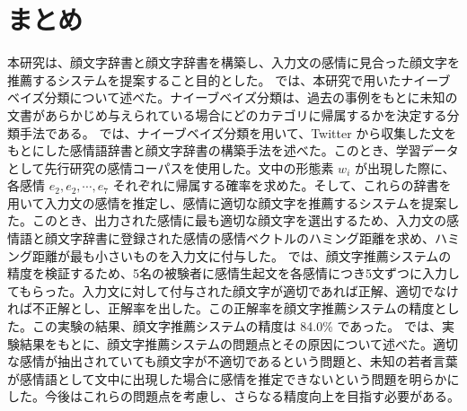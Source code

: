 \documentclass[11pt,a4j]{jsarticle}
\begin{document}
\section{まとめ}\label{sec:summary}
本研究は、顔文字辞書と顔文字辞書を構築し、入力文の感情に見合った顔文字を推薦するシステムを提案すること目的とした。
では、本研究で用いたナイーブベイズ分類について述べた。ナイーブベイズ分類は、過去の事例をもとに未知の文書があらかじめ与えられている場合にどのカテゴリに帰属するかを決定する分類手法である。
では、ナイーブベイズ分類を用いて、Twitter から収集した文をもとにした感情語辞書と顔文字辞書の構築手法を述べた。このとき、学習データとして先行研究の感情コーパスを使用した。文中の形態素 $w_i$ が出現した際に、各感情 $e_2,e_2, \cdots ,e_7$ それぞれに帰属する確率を求めた。そして、これらの辞書を用いて入力文の感情を推定し、感情に適切な顔文字を推薦するシステムを提案した。このとき、出力された感情に最も適切な顔文字を選出するため、入力文の感情語と顔文字辞書に登録された感情の感情ベクトルのハミング距離を求め、ハミング距離が最も小さいものを入力文に付与した。
では、顔文字推薦システムの精度を検証するため、5名の被験者に感情生起文を各感情につき5文ずつに入力してもらった。入力文に対して付与された顔文字が適切であれば正解、適切でなければ不正解とし、正解率を出した。この正解率を顔文字推薦システムの精度とした。この実験の結果、顔文字推薦システムの精度は 84.0\% であった。
では、実験結果をもとに、顔文字推薦システムの問題点とその原因について述べた。適切な感情が抽出されていても顔文字が不適切であるという問題と、未知の若者言葉が感情語として文中に出現した場合に感情を推定できないという問題を明らかにした。今後はこれらの問題点を考慮し、さらなる精度向上を目指す必要がある。

 \clearpage
 
\end{document}
